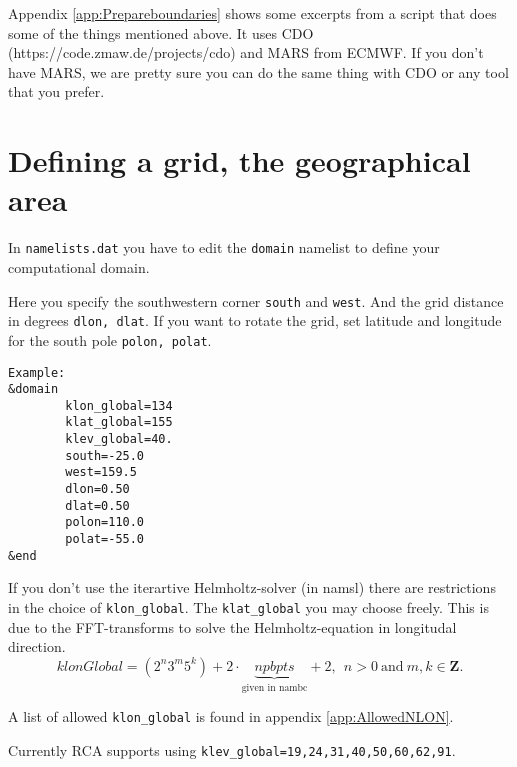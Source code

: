 \documentclass{article}
\begin{document}
Appendix \ref{app:Prepareboundaries}
shows some excerpts from a script that does some of the things mentioned above.
It uses CDO (https://code.zmaw.de/projects/cdo) and MARS from ECMWF.
If you don't have MARS, we are pretty sure you can do the same thing
with CDO or any tool that you prefer.


\section{Defining a grid, the geographical area}
In \verb+namelists.dat+ you have to edit the \verb+domain+ namelist to
define your computational domain.

Here you specify the southwestern corner \verb+south+ and \verb+west+. And the grid
distance in degrees \verb+dlon, dlat+. 
If you want to rotate the grid, set latitude and longitude for the
south pole \verb+polon, polat+.

\begin{verbatim}
Example:
&domain
        klon_global=134
        klat_global=155
        klev_global=40.
        south=-25.0
        west=159.5
        dlon=0.50
        dlat=0.50
        polon=110.0
        polat=-55.0
&end
\end{verbatim}

If you don't use the iterartive Helmholtz-solver (in namsl) there are restrictions in the choice of \verb+klon_global+.
The \verb+klat_global+ you may choose freely. This is due to the FFT-transforms to solve the Helmholtz-equation in longitudal direction.  
\begin{equation}
  klonGlobal = (2^n  3^m  5^k) + 2\cdot \underbrace{npbpts}_{\textrm{given in nambc}} +2 ,~~n>0~\textrm{and}~m,k\in\mathbf{Z}.
\end{equation}

A list of allowed \verb+klon_global+ is found in appendix
\ref{app:AllowedNLON}.

Currently RCA supports using
\verb+klev_global=19,24,31,40,50,60,62,91+.
\end{document}

